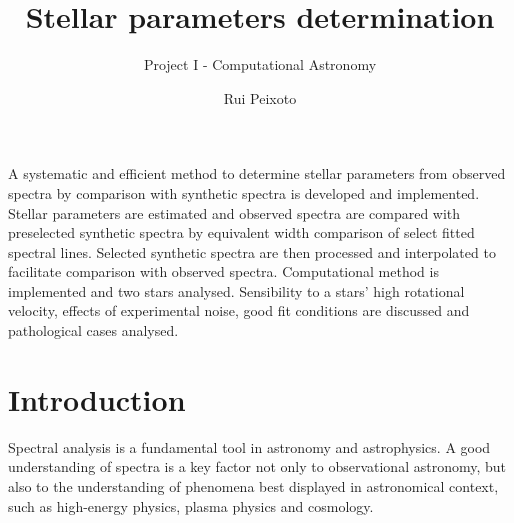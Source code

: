 \documentclass{aa}
\begin{document}
 



   \title{Stellar parameters determination}

   
   \subtitle{Project I - Computational Astronomy}

   \author{Rui Peixoto}



 
  \abstract
   {}
   {A systematic and efficient method to determine stellar parameters from observed spectra by
     comparison with synthetic spectra is developed and implemented.}
   {Stellar parameters are estimated and observed spectra are compared with
     preselected synthetic spectra by equivalent width comparison of select fitted
     spectral lines. Selected synthetic spectra are then processed and
     interpolated to facilitate comparison with observed spectra.}
   {Computational method is implemented and two stars analysed. Sensibility to a
     stars' high rotational velocity, effects of experimental noise, good fit
     conditions are discussed and pathological cases analysed.}
   {}


   \maketitle
%

\section{Introduction}

Spectral analysis is a fundamental tool in astronomy and
astrophysics. A good understanding of spectra is a key factor not only to
observational astronomy, but also to the understanding of phenomena best
displayed in astronomical context, such as high-energy physics, plasma physics and cosmology.
\end{document}
